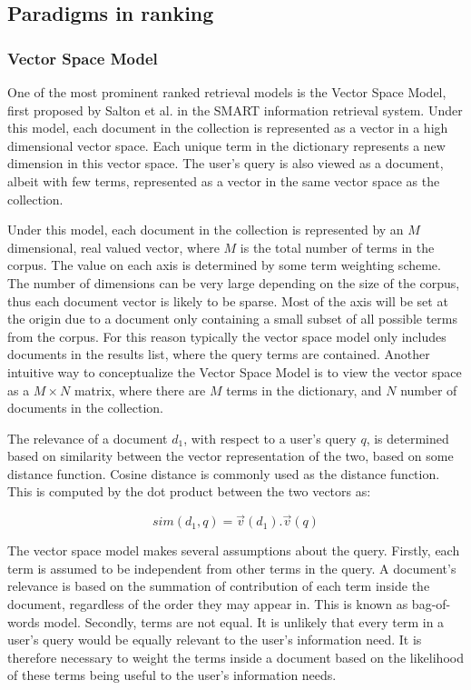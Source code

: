 \subsection{Paradigms in ranking}
\subsubsection{Vector Space Model}


One of the most prominent ranked retrieval models is the Vector Space Model, first proposed by Salton et al. \cite{Salton:1975:VSM:361219.361220} in the SMART information retrieval system. Under this model, each document in the collection is represented as a vector in a high dimensional vector space. Each unique term in the dictionary represents a new dimension in this vector space. The user's query is also viewed as a document, albeit with few terms, represented as a vector in the same vector space as the collection. 

Under this model, each document in the collection is represented by an $M$ dimensional, real valued vector, where $M$ is the total number of terms in the corpus. The value on each axis is determined by some term weighting scheme. The number of dimensions can be very large depending on the size of the corpus, thus each document vector is likely to be sparse. Most of the axis will be set at the origin due to a document only containing a small subset of all possible terms from the corpus. For this reason typically the vector space model only includes documents in the results list, where the query terms are contained. Another intuitive way to conceptualize the Vector Space Model is to view the vector space as a $M \times N$ matrix, where there are $M$ terms in the dictionary, and $N$ number of documents in the collection. 


The relevance of a document $d_1$, with respect to a user's query $q$, is determined based on similarity between the vector representation of the two, based on some distance function. Cosine distance is commonly used as the distance function. This is computed by the dot product between the two vectors as:

\begin{equation}
    sim(d_1,q) = \vec{v}(d_1).\vec{v}(q)
\end{equation}

The vector space model makes several assumptions about the query. Firstly, each term is assumed to be independent from other terms in the query. A document's relevance is based on the summation of contribution of each term inside the document, regardless of the order they may appear in. This is known as bag-of-words model. Secondly, terms are not equal. It is unlikely that every term in a user’s query would be equally relevant to the user’s information need. It is therefore necessary to weight the terms inside a document based on the likelihood of these terms being useful to the user's information needs. 


